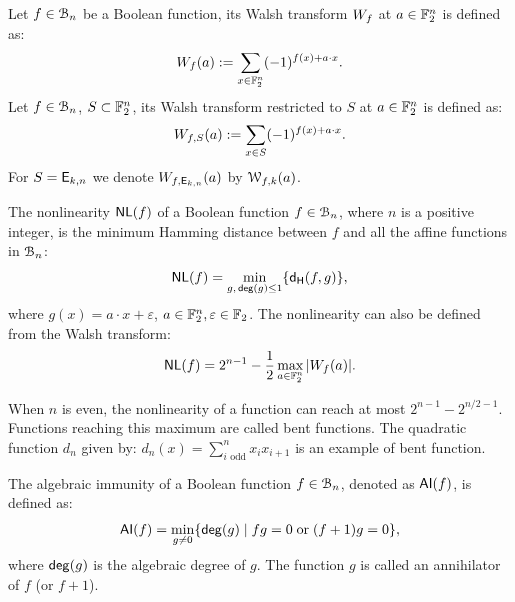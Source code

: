 \documentclass[11pt]{llncs}
\begin{document}
\begin{definition}\label{def:walsh_transform}
	Let $f\in \mathcal{B}_{n}$ be a Boolean function, its Walsh transform $W_{f}$ at $a \in \mathbb{F}_2^n$ is defined as:
	\[  W_{f} (a) := \sum_{x \in \mathbb{F}_2^n} (-1)^{f(x) +  a \cdot x }.\]
	Let $f\in \mathcal{B}_{n}$, $S \subset \mathbb{F}_2^n$, its Walsh transform restricted to $S$ at $a \in \mathbb{F}_2^n$ is defined as:
	\[  W_{f,S} (a) := \sum_{x\in S} (-1)^{f(x)+a \cdot x}.\]
	For $S=\mathsf{E}_{k,n}$ we denote $W_{f,\mathsf{E}_{k,n}} (a)$ by $\mathcal{W}_{f,k}(a)$.%
\end{definition}


	


\begin{definition}[Nonlinearity]%
	\label{def:nl}
	The nonlinearity $\mathsf{NL}(f)$ of a Boolean function $f\in \mathcal{B}_n$, where $n$ is a positive integer, is the minimum Hamming distance between $f$ and all the affine functions in $\mathcal{B}_n$:
	\[ \mathsf{NL}(f) = \min_{g,\, \mathsf{deg}(g)\leq 1} \{ \mathsf{d_H}(f,g) \}{,} \]
	where $g(x)=a\cdot x+\varepsilon$, $a\in \mathbb{F}_2^n, \varepsilon\in \mathbb{F}_2$. 	
	The nonlinearity can also be defined from the Walsh transform:
	\[ \mathsf{NL}(f) = 2^{n-1}- \frac{1}{2} \max_{a\in \mathbb{F}_2^n}{|W_{f}(a)|}. \]
\end{definition}

When $n$ is even, the nonlinearity of a function can reach at most $2^{n-1}-2^{n/2 -1}$. Functions reaching this maximum are called bent functions. The quadratic function $d_n$ given by: $d_n(x)=\sum_{i \text{ odd}}^n x_i x_{i+1}$ is an example of bent function.






\begin{definition} \label{def:ai}
	The algebraic immunity of a Boolean function $f\in \mathcal{B}_{n}$, denoted as $\mathsf{AI}(f)$, is defined as:
	\[ \mathsf{AI}(f) = \min_{g \neq 0}\{ \mathsf{deg}(g) \; | \; fg = 0 \; \text{or} \; (f + 1)g = 0 \}{,} \]
	where $\mathsf{deg}(g)$ is the algebraic degree of $g$.
	The function $g$ is called an annihilator of $f$ (or $f + 1$). 
\end{definition}
\end{document}
